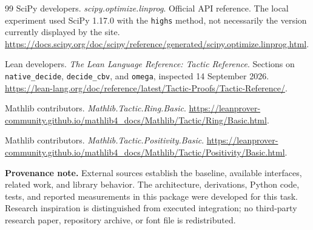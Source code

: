 \begin{thebibliography}{99}
SciPy developers. \emph{scipy.optimize.linprog}.
Official API reference. The local experiment used SciPy 1.17.0 with the
\texttt{highs} method, not necessarily the version currently displayed by the site.
\url{https://docs.scipy.org/doc/scipy/reference/generated/scipy.optimize.linprog.html}.

Lean developers. \emph{The Lean Language Reference: Tactic Reference}.
Sections on \texttt{native\_decide}, \texttt{decide\_cbv}, and \texttt{omega},
inspected 14 September 2026.
\url{https://lean-lang.org/doc/reference/latest/Tactic-Proofs/Tactic-Reference/}.

Mathlib contributors. \emph{Mathlib.Tactic.Ring.Basic}.
\url{https://leanprover-community.github.io/mathlib4_docs/Mathlib/Tactic/Ring/Basic.html}.

Mathlib contributors. \emph{Mathlib.Tactic.Positivity.Basic}.
\url{https://leanprover-community.github.io/mathlib4_docs/Mathlib/Tactic/Positivity/Basic.html}.
\end{thebibliography}

\medskip
\textbf{Provenance note.} External sources establish the baseline, available
interfaces, related work, and library behavior. The architecture, derivations,
Python code, tests, and reported measurements in this package were developed
for this task. Research inspiration is distinguished from executed integration;
no third-party research paper, repository archive, or font file is redistributed.
